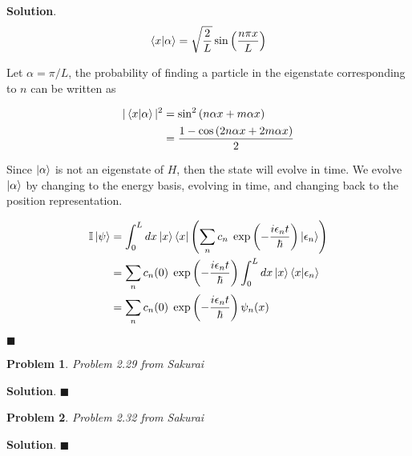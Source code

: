 \documentclass[12pt]{article}
\newtheorem{p}{Problem}
\theoremstyle{definition}
\newenvironment{s}{%
        \begin{trivlist} \item \textbf{Solution}. }{%
            \hspace*{\fill} $\blacksquare$\end{trivlist}}%
\begin{document}
{\begin{s}
\begin{align*}
\bra{x}\ket{\alpha} = \sqrt{\frac{2}{L}}\sin\left(\frac{n\pi x}{L}\right)
\end{align*}

Let $\alpha = \pi/L$, the probability of finding a particle in the eigenstate corresponding to $n$ can be written as

\begin{align*}
|\bra{x}\ket{\alpha}|^{2} &= \sin^{2}\left(n\alpha x + m\alpha x\right)\\
&= \frac{1-\cos\left(2n\alpha x + 2m\alpha x\right)}{2}\\
\end{align*}

Since $\ket{\alpha}$ is not an eigenstate of $H$, then the state will evolve in time. We evolve $\ket{\alpha}$ by changing to the energy basis, evolving in time, and changing back to the position representation. 

\begin{align*}
\mathbb{I}\ket{\psi} &= \int_{0}^{L} dx\ket{x}\bra{x} \left(\sum_{n}c_{n}\;\exp\left(-\frac{i\epsilon_{n}t}{\hbar}\right)\ket{\epsilon_{n}}\right)\\
&= \sum_{n}c_{n}(0)\;\exp\left(-\frac{i\epsilon_{n}t}{\hbar}\right)\int_{0}^{L} dx\ket{x}\bra{x} \ket{\epsilon_{n}}\\
&= \sum_{n}c_{n}(0)\;\exp\left(-\frac{i\epsilon_{n}t}{\hbar}\right)\psi_{n}(x)\\
\end{align*}



\end{s}

\begin{p}
Problem 2.29 from Sakurai
\end{p}

\begin{s}
\end{s}

\begin{p}
Problem 2.32 from Sakurai
\end{p}

\begin{s}
\end{s}
\end{document}
